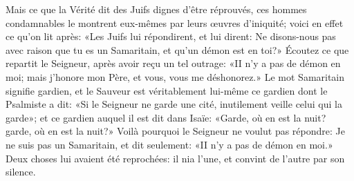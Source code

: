 Mais ce que la Vérité dit des Juifs dignes d’être réprouvés,
	ces hommes condamnables le montrent eux-mêmes par leurs œuvres d’iniquité;
	voici en effet ce qu’on lit après:
	«Les Juifs lui répondirent, et lui dirent:
	Ne disons-nous pas avec raison que tu es un Samaritain,
	et qu’un démon est en toi?»
Écoutez ce que repartit le Seigneur, après avoir reçu un tel outrage:
	«II n’y a pas de démon en moi;
	mais j’honore mon Père, et vous, vous me déshonorez.»
Le mot Samaritain signifie gardien,
	et le Sauveur est véritablement lui-même ce gardien dont le Psalmiste a dit:
	«Si le Seigneur ne garde une cité, inutilement veille celui qui la garde»;
	et ce gardien auquel il est dit dans Isaïe:
	«Garde, où en est la nuit? garde, où en est la nuit?»
Voilà pourquoi le Seigneur ne voulut pas répondre: Je ne suis pas un Samaritain,
	et dit seulement: «II n’y a pas de démon en moi.»
Deux choses lui avaient été reprochées:
	il nia l’une, et convint de l’autre par son silence.
